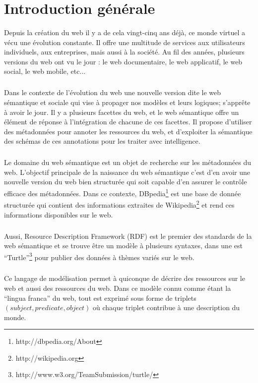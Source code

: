 \section*{Introduction générale}
\paragraph{}
Depuis la création du web il y a de cela vingt-cinq ans déjà, ce monde virtuel a vécu une évolution constante. Il offre une multitude de services aux utilisateurs individuels, aux entreprises, mais aussi à la société. Au fil des années, plusieurs versions du web ont vu le jour : le web documentaire, le web applicatif, le web social, le web mobile, etc...
\subparagraph{}
Dans le contexte de l’évolution du web une nouvelle version dite le web sémantique et sociale qui vise à propager nos modèles et leurs logiques; s’apprête à avoir le jour. Il y a plusieurs facettes du web, et le web sémantique offre un élément de réponse à l’intégration de chacune de ces facettes. Il propose d’utiliser des métadonnées pour annoter les ressources du web, et d’exploiter la sémantique des schémas de ces annotations pour les traiter avec intelligence.
\subparagraph{}
Le domaine du web sémantique est un objet de recherche sur les métadonnées du web. L'objectif principale de la naissance du web sémantique c'est d’en avoir une nouvelle version du web bien structurée qui soit capable d’en assurer le contrôle efficace des métadonnées. Dans ce contexte, DBpedia\footnote{http://dbpedia.org/About} est une base de donnée structurée qui contient des informations extraites de Wikipedia\footnote{http://wikipedia.org} et rend ces informations disponibles sur le web.
\subparagraph{}
Aussi, Resource Description Framework (RDF) est le premier des standards de la web sémantique et se trouve être un modèle à plusieurs syntaxes, dans une est  “Turtle”\footnote{http://www.w3.org/TeamSubmission/turtle/} pour publier des données à thèmes variés sur le web.
\subparagraph{}
Ce langage de modélisation permet à quiconque de décrire des ressources sur le web et aussi des ressources du web. Dans ce modèle connu comme étant la “lingua franca” du web, tout est exprimé sous forme de triplets $(subject, predicate, object)$ où chaque triplet contribue à une description du monde.
